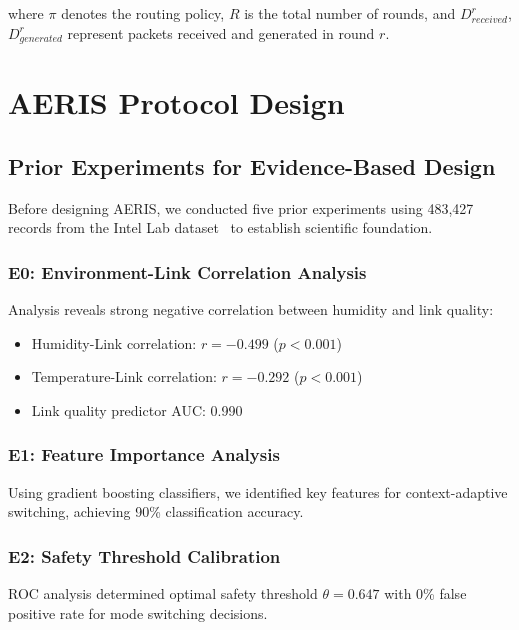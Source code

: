 \documentclass[sensors,article,submit,moreauthors,pdftex]{Definitions/mdpi}
\begin{document}
where $\pi$ denotes the routing policy, $R$ is the total number of rounds, and $D_{received}^r$, $D_{generated}^r$ represent packets received and generated in round $r$.

\section{AERIS Protocol Design}\label{sec:method}

\subsection{Prior Experiments for Evidence-Based Design}

Before designing AERIS, we conducted five prior experiments using 483,427 records from the Intel Lab dataset~\cite{IntelLabData2004} to establish scientific foundation.

\subsubsection{E0: Environment-Link Correlation Analysis}

Analysis reveals strong negative correlation between humidity and link quality:
\begin{itemize}
\item Humidity-Link correlation: $r = -0.499$ ($p < 0.001$)
\item Temperature-Link correlation: $r = -0.292$ ($p < 0.001$)
\item Link quality predictor AUC: 0.990
\end{itemize}

\subsubsection{E1: Feature Importance Analysis}

Using gradient boosting classifiers, we identified key features for context-adaptive switching, achieving 90\% classification accuracy.

\subsubsection{E2: Safety Threshold Calibration}

ROC analysis determined optimal safety threshold $\theta = 0.647$ with 0\% false positive rate for mode switching decisions.
\end{document}
